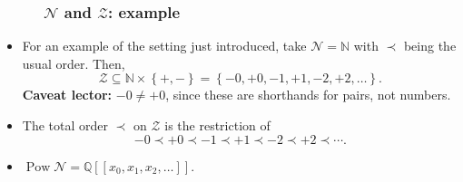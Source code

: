 \documentclass{beamer}
\newcommand{\NN}{{\mathbb N}}
\newcommand{\QQ}{{\mathbb Q}}
\newcommand{\calN}{\mathcal{N}}
\newcommand{\calZ}{\mathcal{Z}}
\newcommand{\fti}[1]{\frametitle{\ \ \ \ \ #1}}
\newcommand{\set}[1]{\left\{ #1 \right\}}
\newcommand{\ive}[1]{\left[ #1 \right]}
\theoremstyle{plain}
\begin{document}
\begin{frame}
\fti{$\calN$ and $\calZ$: example}

\begin{itemize}

\item For an example of the setting just introduced, take
$\calN = \NN$ with $\prec$ being the usual order. Then,
\[
\calZ \subseteq \NN \times \set{+, -}
= \set{ -0, +0, -1, +1, -2, +2, \ldots } .
\]
\textbf{Caveat lector:} $-0 \neq +0$, since these are shorthands for pairs, not
numbers.

\pause

\item The total order $\prec$ on $\calZ$ is the restriction of
\[
-0 \prec +0 \prec -1 \prec +1 \prec -2 \prec +2 \prec \cdots .
\]

\pause

\item $\operatorname*{Pow}\mathcal{N}
= \QQ\ive{\ive{x_0, x_1, x_2, \ldots}}$.

\end{itemize}

\end{frame}
\end{document}
